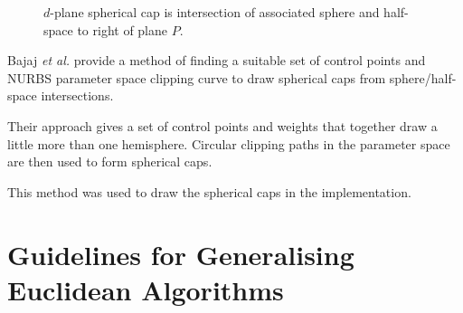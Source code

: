 \begin{figure} \centering
{}
\caption{$d$-plane spherical cap is intersection of associated sphere and half-space
to right of plane $P$.}
\label{fig:sphereplane}
\end{figure}

Bajaj \emph{et al.} \cite{spherecap} provide a method of finding
a suitable set of control points and NURBS parameter space clipping
curve to draw spherical caps from sphere/half-space intersections.

Their approach gives a set of control points and weights that together
draw a little more than one hemisphere. Circular clipping paths in the 
parameter space are then used to form spherical caps.

This method was used to draw the spherical caps in the implementation.
\section{Guidelines for Generalising Euclidean Algorithms}

